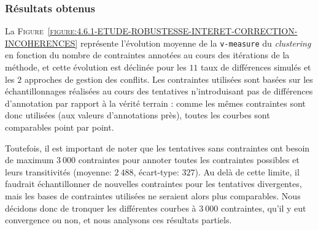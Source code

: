 		\subsubsection{Résultats obtenus}
		
			La \textsc{Figure~\ref{figure:4.6.1-ETUDE-ROBUSTESSE-INTERET-CORRECTION-INCOHERENCES}} représente l'évolution moyenne de la \texttt{v-measure} du \textit{clustering} en fonction du nombre de contraintes annotées au cours des itérations de la méthode, et cette évolution est déclinée pour les $11$ taux de différences simulés et les $2$ approches de gestion des conflits.
			Les contraintes utilisées sont basées sur les échantillonnages réalisées au cours des tentatives n'introduisant pas de différences d'annotation par rapport à la vérité terrain : comme les mêmes contraintes sont donc utilisées (aux valeurs d'annotations près), toutes les courbes sont comparables point par point.
			
			\begin{leftBarWarning}
				Toutefois, il est important de noter que les tentatives sans contraintes ont besoin de maximum $3~000$ contraintes pour annoter toutes les contraintes possibles et leurs transitivités (moyenne: $2~488$, écart-type: $327$).
				Au delà de cette limite, il faudrait échantillonner de nouvelles contraintes pour les tentatives divergentes, mais les bases de contraintes utilisées ne seraient alors plus comparables.
				Nous décidons donc de tronquer les différentes courbes à $3~000$ contraintes, qu'il y eut convergence ou non, et nous analysons ces résultats partiels.
			\end{leftBarWarning}
			
